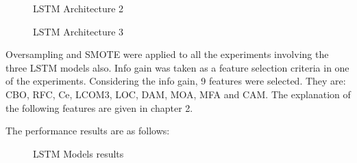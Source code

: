 \begin{figure}
%
  \caption{LSTM Architecture 2}
  \label{fig:key}
\end{figure}

\begin{figure}
%
  \caption{LSTM Architecture 3}
  \label{fig:key}
\end{figure}
 
Oversampling and SMOTE were applied to all the experiments involving the three LSTM models also. Info gain was taken as a feature selection criteria in one of the experiments. Considering the info gain, 9 features were selected. They are: CBO, RFC, Ce, LCOM3, LOC, DAM, MOA, MFA and CAM. The explanation of the following features are given in chapter 2.

The performance results are as follows:

 \begin{figure}
%
  \caption{LSTM Models results}
  \label{fig:key}
\end{figure}

